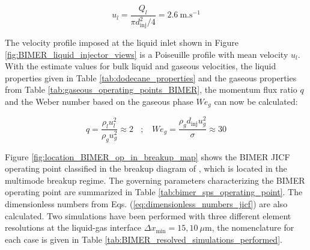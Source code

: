 \begin{equation}
u_l = \frac{Q_l}{\pi d_\mathrm{inj}^2 / 4} = 2.6 ~ \mathrm{m}.\mathrm{s}^{-1}
\end{equation}


The velocity profile imposed at the liquid inlet shown in Figure \ref{fig:BIMER_liquid_injector_views} is a Poiseuille profile with mean velocity $u_l$. With the estimate values for bulk liquid and gaseous velocities, the liquid properties given in Table \ref{tab:dodecane_properties} and the gaseous properties from Table \ref{tab:gaseous_operating_points_BIMER}, the momentum flux ratio $q$ and the Weber number based on the gaseous phase $We_g$ can now be calculated:


\begin{equation}
q =  \frac{\rho_l u_l^2}{\rho_g u_g^2} \approx 2 ~~~~ ; ~~~~  We_g =  \frac{\rho_g d_\mathrm{inj} u_g^2}{\sigma} \approx 30
\end{equation}


Figure \ref{fig:location_BIMER_op_in_breakup_map} shows the BIMER JICF operating point classified in the breakup diagram of \citeColor[wu_breakup_1997], which is located in the multimode breakup regime. The governing parameters characterizing the BIMER operating point are summarized in Table \ref{tab:bimer_sps_operating_point}. The dimensionless numbers from Eqs. (\ref{eq:dimensionless_numbers_jicf}) are also calculated. Two simulations have been performed with three different element resolutions at the liquid-gas interface $\Delta x_\mathrm{min} = 15, 10~\mu$m, the nomenclature for each case is given in Table \ref{tab:BIMER_resolved_simulations_performed}.

